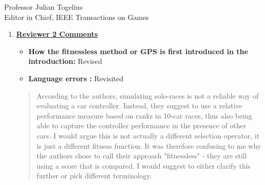 \documentclass[10pt]{letter} %
\begin{document}
\begin{letter}{Professor Julian Togelius \\ Editor in Chief, IEEE Transactions on Games}
\begin{enumerate}
We have added this text to the paper in order to clarify what we
understand by fitnessless:
{\em Although this selection uses a score that could be assimilated to a fitness, it's actually an extension of a tournament selection policy since it creates tournaments of several individuals, and ``scores'' them according to how they fare in these races. This is not actually a fitness, since it's not intrinsic to the individual. It's equivalent to, in a $n$-tournament selection that is repeated several times, giving a score of $n$ to the first, $n-1$ to the second, and then using this for selection. That score is, thus, not a fitness but actually a way of keeping track of the position of the individual in the different tournaments it's participated.}

\item {\bf \underline{ Reviewer 2 Comments}}\\
	\begin{itemize}
		\item {\bf How the fitnessless method or GPS is first introduced in the introduction:} Revised\\
		\item {\bf Language errors :} Revisited
                \end{itemize}

                \begin{quote}
                 According to the authors, simulating solo-races is
                 not a reliable way of evaluating a car
                 controller. Instead, they suggest to use a relative
                 performance measure based on ranks in 10-car races,
                 thus also being able to capture the controller
                 performance in the presence of other cars. I would
                 argue this is not actually a different selection
                 operator, it is just a different fitness function. It
                 was therefore confusing to me why the authors chose
                 to call their approach "fitnessless" - they are still
                 using a score that is compared. I would suggest to
                 either clarify this further or pick different
                 terminology.
               \end{quote}


\end{enumerate}
\end{letter}
\end{document}
